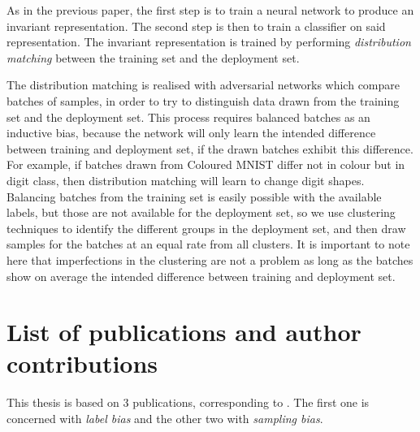 As in the previous paper, the first step is to train a neural network to produce an invariant representation.
The second step is then to train a classifier on said representation.
The invariant representation is trained by performing \emph{distribution matching} between the training set and the deployment set.

The distribution matching is realised with adversarial networks which compare batches of samples,
in order to try to distinguish data drawn from the training set and the deployment set.
This process requires balanced batches as an inductive bias,
because the network will only learn the intended difference between training and deployment set,
if the drawn batches exhibit this difference.
For example, if batches drawn from Coloured MNIST differ not in colour but in digit class,
then distribution matching will learn to change digit shapes.
Balancing batches from the training set is easily possible with the available labels,
but those are not available for the deployment set,
so we use clustering techniques to identify the different groups in the deployment set,
and then draw samples for the batches at an equal rate from all clusters.
It is important to note here that imperfections in the clustering are not a problem
as long as the batches show on average the intended difference between training and deployment set.

\section{List of publications and author contributions}%
\label{sec:claims-contributions}
This thesis is based on 3 publications, corresponding to .
The first one is concerned with \emph{label bias} and the other two with \emph{sampling bias}.

